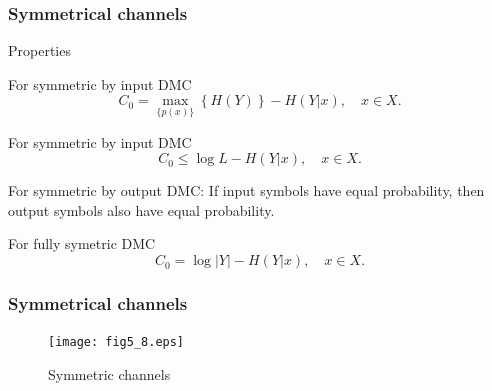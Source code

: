 \documentclass[14pt]{beamer}
\begin{document}
\begin{frame}
\frametitle{Symmetrical channels}
Properties
\begin{itemize}
\small{

    \item[1] 
    \begin{prop} \label{pr5_1} For symmetric by input DMC
    \[
    C_0 = \mathop {\max }\limits_{\{p(x)\}} \left\{ {H(Y)} \right\} - H(Y\vert
    x), \quad x \in X.
    \]
    \end{prop}
    
    \item[2]
    \begin{prop} \label{pr5_2}  For symmetric by input DMC
    \[
    C_0 \le \log L - H(Y\vert x), \quad x \in X.
    \]
    \end{prop}
    
    \item[3]
    \begin{prop} \label{pr5_3}  For symmetric by output DMC: If input symbols have equal probability, then output symbols also have equal probability.
    \end{prop}
    
    \item[4]
    \begin{prop}\label{pr5_4}  For fully symetric DMC
    \[
    C_0 = \log \vert Y\vert - H(Y\vert x), \quad x \in X.
    \]
    \end{prop}
}

\end{itemize}
\end{frame}


\begin{frame}
\frametitle{Symmetrical channels}
\begin{itemize}
    \begin{figure}[ht]
    \texttt{[image: fig5\_8.eps]}
    \caption{Symmetric channels} \label{fig5_8}
    \end{figure}
\end{itemize}
\end{frame}
\end{document}
